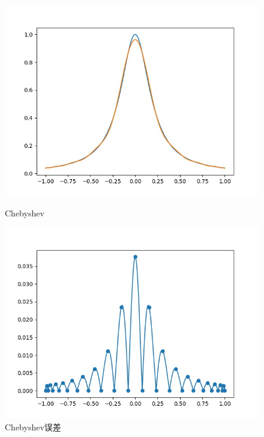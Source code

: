 \documentclass{article}
\numberwithin{equation}{section}
\numberwithin{table}{section}
\begin{document}
\begin{figure}[H]
    \begin{minipage}[t]{0.48\linewidth}
        \centering
        \includegraphics[scale=0.5]{fChebyshev.jpg}
        \caption{Chebyshev}
    \end{minipage}
    \begin{minipage}[t]{0.48\linewidth}
        \centering
        \includegraphics[scale=0.5]{fChebyshev.sub.jpg}
        \caption{Chebyshev误差}
    \end{minipage}
\end{figure}
\end{document}
